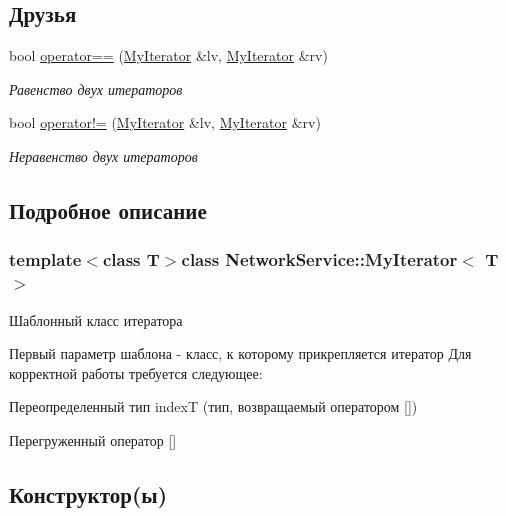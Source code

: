 \subsection*{Друзья}
\begin{DoxyCompactItemize}
\item 
bool \hyperlink{class_network_service_1_1_my_iterator_a44acb87c982f4dd4b401b1e46e7b93b7}{operator==} (\hyperlink{class_network_service_1_1_my_iterator}{My\+Iterator} \&lv, \hyperlink{class_network_service_1_1_my_iterator}{My\+Iterator} \&rv)
\begin{DoxyCompactList}\small\item\em Равенство двух итераторов \end{DoxyCompactList}\item 
bool \hyperlink{class_network_service_1_1_my_iterator_a3ef5b0b89d2266aa10cb593e6b2d1255}{operator!=} (\hyperlink{class_network_service_1_1_my_iterator}{My\+Iterator} \&lv, \hyperlink{class_network_service_1_1_my_iterator}{My\+Iterator} \&rv)
\begin{DoxyCompactList}\small\item\em Неравенство двух итераторов \end{DoxyCompactList}\end{DoxyCompactItemize}


\subsection{Подробное описание}
\subsubsection*{template$<$class T$>$class Network\+Service\+::\+My\+Iterator$<$ T $>$}

Шаблонный класс итератора 

Первый параметр шаблона -\/ класс, к которому прикрепляется итератор Для корректной работы требуется следующее\+:
\begin{DoxyItemize}
\item Переопределенный тип index\+T (тип, возвращаемый оператором \mbox{[}\mbox{]})
\item Перегруженный оператор \mbox{[}\mbox{]} 
\end{DoxyItemize}

\subsection{Конструктор(ы)}
\hypertarget{class_network_service_1_1_my_iterator_afdc20f191ceb30ab06cd7f10d4a6b699}{}
